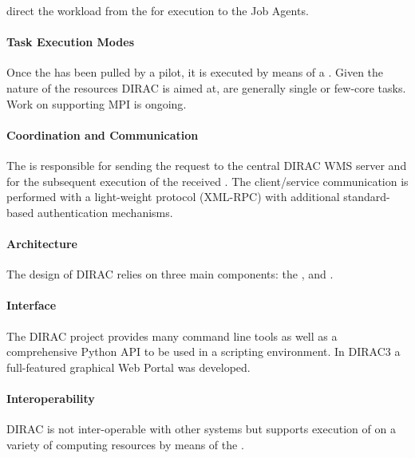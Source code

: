 \documentclass{sig-alternate}
\begin{document}
 direct the workload from the 
for execution to the Job Agents.

\paragraph{Task Execution Modes}

Once the  has been pulled by a pilot, it is executed by means of a
. Given the nature of the resources DIRAC is aimed at,
 are generally single or few-core tasks. Work on supporting MPI is
ongoing\cite{}.

\paragraph{Coordination and Communication}

The  is responsible for sending the 
request to the central DIRAC WMS server and for the subsequent execution of the
received . The client/service communication is performed with
a light-weight protocol (XML-RPC) with additional standard-based authentication
mechanisms.

\paragraph{Architecture}

The design of DIRAC relies on three main components: the 
, and .

\paragraph{Interface}

The DIRAC project provides many command line tools as well as a comprehensive
Python API to be used in a scripting environment. In DIRAC3 a full-featured
graphical Web Portal was developed.

\paragraph{Interoperability}

DIRAC is not inter-operable with other \pilot systems but supports execution of
\pilots on a variety of computing resources by means of the .
\end{document}
